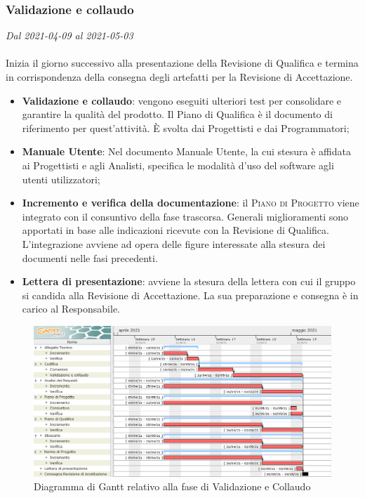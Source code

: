 \subsubsection{Validazione e collaudo}

\textit{Dal 2021-04-09 al 2021-05-03}
\\\\
Inizia il giorno successivo alla presentazione della Revisione di Qualifica e termina in corrispondenza della consegna degli artefatti per la Revisione di Accettazione.
\begin{itemize}
	\item \textbf{Validazione e collaudo}: vengono eseguiti ulteriori test per consolidare e garantire la qualità del prodotto. Il Piano di Qualifica è il documento di riferimento per quest'attività. \`E svolta dai Progettisti e dai Programmatori;
	\item \textbf{Manuale Utente}: Nel documento Manuale Utente, la cui stesura è affidata ai Progettisti e agli Analisti, specifica le modalità d'uso del software agli utenti utilizzatori;
	\item \textbf{Incremento e verifica della documentazione}: il \textsc{Piano di Progetto} viene integrato con il consuntivo della fase trascorsa. Generali miglioramenti sono apportati in base alle indicazioni ricevute con la Revisione di Qualifica. L'integrazione avviene ad opera delle figure interessate alla stesura dei documenti nelle fasi precedenti.
	\item \textbf{Lettera di presentazione}: avviene la stesura della lettera con cui il gruppo si candida alla Revisione di Accettazione. La sua preparazione e consegna è in carico al Responsabile.
\end{itemize}

\begin{figure}[H]
	\centering
	\includegraphics[scale=0.51]{res/images/06_gantt_validazione}
	\caption{Diagramma di Gantt relativo alla fase di Validazione e Collaudo}
\end{figure}